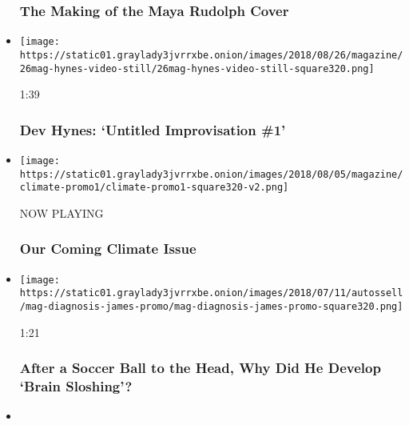 \begin{itemize}
  \hypertarget{the-making-of-the-maya-rudolph-cover}{%
  \subsubsection{The Making of the Maya Rudolph
  Cover}\label{the-making-of-the-maya-rudolph-cover}}
\item
  \href{https://www.nytimes3xbfgragh.onion/video/magazine/100000006065275/dev-hynes-untitled-improvisation-1.html?action=click\&module=video-series-bar\&region=header\&pgtype=Article\&playlistId=video/magazine}{}

  \texttt{[image: https://static01.graylady3jvrrxbe.onion/images/2018/08/26/magazine/26mag-hynes-video-still/26mag-hynes-video-still-square320.png]}

  1:39

  \hypertarget{dev-hynes-untitled-improvisation-1}{%
  \subsubsection{Dev Hynes: `Untitled Improvisation
  \#1'}\label{dev-hynes-untitled-improvisation-1}}
\item
  \texttt{[image: https://static01.graylady3jvrrxbe.onion/images/2018/08/05/magazine/climate-promo1/climate-promo1-square320-v2.png]}

  NOW PLAYING

  \hypertarget{our-coming-climate-issue-2}{%
  \subsubsection{Our Coming Climate
  Issue}\label{our-coming-climate-issue-2}}
\item
  \href{https://www.nytimes3xbfgragh.onion/video/magazine/100000006000313/after-taking-a-soccer-ball-to-the-head-an-18-year-old-student-develops-a-mental-fogginess.html?action=click\&module=video-series-bar\&region=header\&pgtype=Article\&playlistId=video/magazine}{}

  \texttt{[image: https://static01.graylady3jvrrxbe.onion/images/2018/07/11/autossell/mag-diagnosis-james-promo/mag-diagnosis-james-promo-square320.png]}

  1:21

  \hypertarget{after-a-soccer-ball-to-the-head-why-did-he-develop-brain-sloshing}{%
  \subsubsection{After a Soccer Ball to the Head, Why Did He Develop
  `Brain
  Sloshing'?}\label{after-a-soccer-ball-to-the-head-why-did-he-develop-brain-sloshing}}
\item
  \href{https://www.nytimes3xbfgragh.onion/video/magazine/100000005939102/new-york-issue-behind-the-scenes.html?action=click\&module=video-series-bar\&region=header\&pgtype=Article\&playlistId=video/magazine}{}


\end{itemize}
